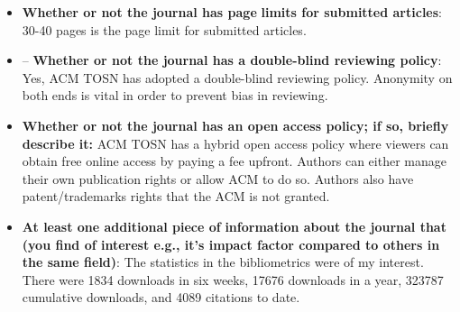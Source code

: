 \documentclass[11pt,twocolumn]{article}
\begin{document}
\begin{itemize}
  \item{\bf{Whether or not the journal has page}}
  {\bf{limits for submitted articles}}: 
  30-40 pages is the page limit for submitted articles.
  \item – {\bf{Whether or not the journal has a }}
  {\bf{double-blind reviewing policy}}:
  Yes, ACM TOSN has adopted a double-blind reviewing policy. Anonymity on both ends is vital in order to prevent bias in reviewing.
  \item{\bf{Whether or not the journal has an open access policy; if so, briefly describe it:}}
  ACM TOSN has a hybrid open access policy where viewers can obtain free online access by paying a fee upfront. Authors can either manage their own publication rights or allow ACM to do so. Authors also have patent/trademarks rights that the ACM is not granted. 
  \item{\bf{At least one additional piece of}}
  {\bf{information about the journal that}}
  {\bf{(you find of interest e.g., it’s impact factor }}
  {\bf{compared to others in the same field)}}:
  The statistics in the bibliometrics were of my interest. There were 1834 downloads in six weeks, 17676 downloads in a year, 323787 cumulative downloads, and 4089 citations to date.
\end{itemize}


\maketitle
\end{document}
